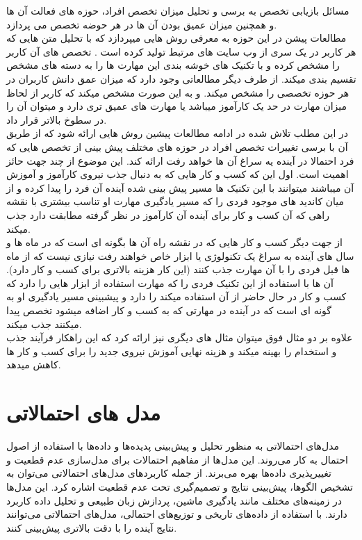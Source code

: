 مسائل بازیابی تخصص به برسی و تحلیل میزان تخصص افراد، حوزه های فعالت آن ها و همچنین میزان عمیق بودن آن ها در هر حوضه تخصص می پردازد.
\\
مطالعات پیشن در این حوزه به معرفی روش هایی میپردازد که با تحلیل متن هایی که هر کاربر در یک سری از وب سایت های مرتبط تولید کرده است . تخصص های آن کاربر را مشخص کرده و با تکنیک های خوشه بندی این مهارت ها را به دسته های مشخص تقسیم بندی میکند.
از طرف دیگر مطالعاتی وجود دارد که میزان عمق دانش کاربران در هر حوزه تخصصی را مشخص میکند. و به این صورت مشخص میکند که کاربر از لحاظ میزان مهارت در حد یک کارآموز میباشد یا مهارت های عمیق تری دارد و میتوان آن را در سطوخ بالاتر قرار داد.
\\
در این مطلب تلاش شده در ادامه مطالعات پیشین روش هایی ارائه شود که از طریق آن با برسی تغییرات تخصص افراد در حوزه های مختلف پیش بینی از تخصص هایی که فرد احتمالا در آینده یه سراغ آن ها خواهد رفت ارائه کند.
این موضوع از چند جهت حائز اهمیت است. اول این که کسب و کار هایی که به دنبال جذب نیروی کارآموز و آموزش آن میباشند میتوانند با این تکنیک ها مسیر پیش بینی شده آینده آن فرد را پیدا کرده و از میان کاندید های موجود فردی را که مسیر یادگیری مهارت او تناسب بیشتری با نقشه راهی که آن کسب و کار برای آینده آن کارآموز در نظر گرفته مطابقت دارد جذب میکند.
\\
از جهت دیگر کسب و کار هایی که در نقشه راه آن ها بگونه ای است که در ماه ها و سال های آینده به سراغ یک تکنولوژی یا ابزار خاص خواهند رفت نیازی نیست که از ماه ها قبل فردی را با آن مهارت جذب کنند (این کار هزینه بالاتری برای کسب و کار دارد).  آن ها با استفاده از این تکنیک فردی را که مهارت استفاده از ابزار هایی را دارد که کسب و کار در حال حاضر از آن استفاده میکند را دارد و پیشبینی مسیر یادگیری او به گونه ای است که در آینده در مهارتی که به کسب و کار اضافه میشود تخصص پیدا میکنند جذب میکند.
\\
علاوه بر دو مثال فوق میتوان مثال های دیگری نیز ارائه کرد که این راهکار فرآیند جذب و استخدام را بهینه میکند و هزینه نهایی آموزش نیروی جدید را برای کسب و کار ها کاهش میدهد.
\cite{retrival}


\section{مدل های احتمالاتی}
\hspace*{2em}
مدل‌های احتمالاتی به منظور تحلیل و پیش‌بینی پدیده‌ها و داده‌ها با استفاده از اصول احتمال به	 کار می‌روند. این مدل‌ها از مفاهیم احتمالات برای مدل‌سازی عدم قطعیت و تغییرپذیری داده‌ها بهره می‌برند. از جمله کاربردهای مدل‌های احتمالاتی می‌توان به تشخیص الگوها، پیش‌بینی نتایج و تصمیم‌گیری تحت عدم قطعیت اشاره کرد. این مدل‌ها در زمینه‌های مختلف مانند یادگیری ماشین، پردازش زبان طبیعی و تحلیل داده کاربرد دارند. با استفاده از داده‌های تاریخی و توزیع‌های احتمالی، مدل‌های احتمالاتی می‌توانند نتایج آینده را با دقت بالاتری پیش‌بینی کنند.

